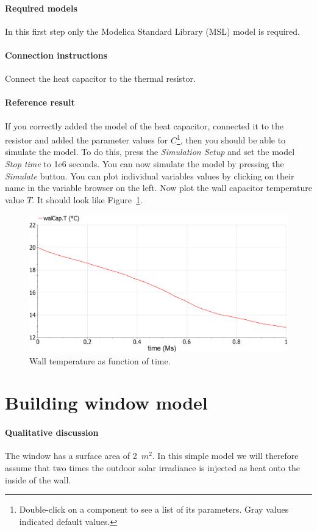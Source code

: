 \documentclass[10pt,a4paper]{article}
\begin{document}
\paragraph{Required models}
In this first step only the Modelica Standard Library (MSL) model  is required.

\paragraph{Connection instructions}
Connect the heat capacitor to the thermal resistor.

\paragraph{Reference result}
If you correctly added the model of the heat capacitor, connected it to the resistor and added the parameter values for $C$\footnote{Double-click on a component to see a list of its parameters. Gray values indicated default values.}, then you should be able to simulate the model. To do this, press the \textit{Simulation Setup} and set the model \textit{Stop time} to 1e6 seconds. You can now simulate the model by pressing the \textit{Simulate} button. You can plot individual variables values by clicking on their name in the variable browser on the left. Now plot the wall capacitor temperature value $T$. It should look like Figure~\ref{fig:res1}.

\begin{figure}[h]
\centering
\includegraphics[width=0.6\columnwidth]{img/result1.png}
\caption{Wall temperature as function of time.}
\label{fig:res1}
\end{figure}



\newpage
\section{Building window model}
\paragraph{Qualitative discussion}
The window has a surface area of 2~$m^2$. In this simple model we will therefore assume that two times the outdoor solar irradiance is injected as heat onto the inside of the wall.
\end{document}
